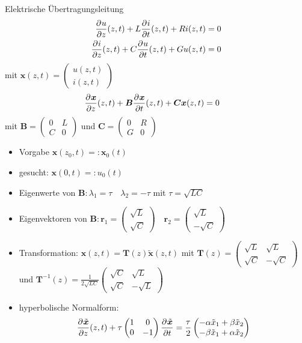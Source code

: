 \begin{bsp}{Elektrische Übertragungsleitung}
\begin{align*}
\frac{\partial^{} u}{\partial z}(z,t)+L\frac{\partial^{} i}{\partial t}(z,t)+Ri(z,t)&=0 \\
\frac{\partial^{} i}{\partial z}(z,t)+C\frac{\partial^{} u}{\partial t}(z,t)+Gu(z,t)&=0
\end{align*}
mit $\bm{x}(z,t)=\begin{pmatrix}
u(z,t) \\ i(z,t)
\end{pmatrix}$
\begin{align*}
\frac{\partial^{} \bm{x}}{\partial z}(z,t)+\bm{B}\frac{\partial^{} \bm{x}}{\partial t}(z,t)+\bm{C}\bm{x}(z,t)&=0
\end{align*}
mit $\bm{B}=\begin{pmatrix}
0 & L \\ C & 0
\end{pmatrix}$ und $\bm{C}=\begin{pmatrix}
0 & R \\ G & 0
\end{pmatrix}$
\begin{itemize}
\item[] Vorgabe $\bm{x}(z_0,t) =:\bm{x}_0(t)$
\item[] gesucht: $\bm{x}(0,t) =: u_0(t)$
\item[] Eigenwerte von $\bm{B}:\lambda_1 = \tau \quad \lambda_2 = -\tau$ mit $\tau = \sqrt{LC}$
\item[] Eigenvektoren von $\bm{B}:\bm{r}_1 = \begin{pmatrix}\sqrt{L} \\ \sqrt{C}\end{pmatrix} \quad \bm{r}_2 = \begin{pmatrix}\sqrt{L} \\ -\sqrt{C}\end{pmatrix} $
\item[] Transformation: $\bm{x}(z,t)=\bm{T}(z)\tilde{\bm{x}}(z,t)$ \newline mit  $\bm{T}(z) = \begin{pmatrix}\sqrt{L} &\sqrt{L} \\ \sqrt{C}&-\sqrt{C}\end{pmatrix}$ und $\bm{T}^{-1}(z) =\frac{1}{2\sqrt{LC}} \begin{pmatrix}\sqrt{C} &\sqrt{L} \\ \sqrt{C} &-\sqrt{L}\end{pmatrix}$
\item[] hyperbolische Normalform: \[ \frac{\partial^{} \tilde{\bm{x}}}{\partial z}(z,t)+\tau\begin{pmatrix}1 & 0 \\ 0 & -1\end{pmatrix}\frac{\partial^{} \tilde{\bm{x}}}{\partial t}=\frac{\tau}{2}\begin{pmatrix}-\alpha \tilde{x}_1+\beta\tilde{x}_2 \\ -\beta \tilde{x}_1+\alpha\tilde{x}_2\end{pmatrix} \] 

\end{itemize}
\end{bsp}
